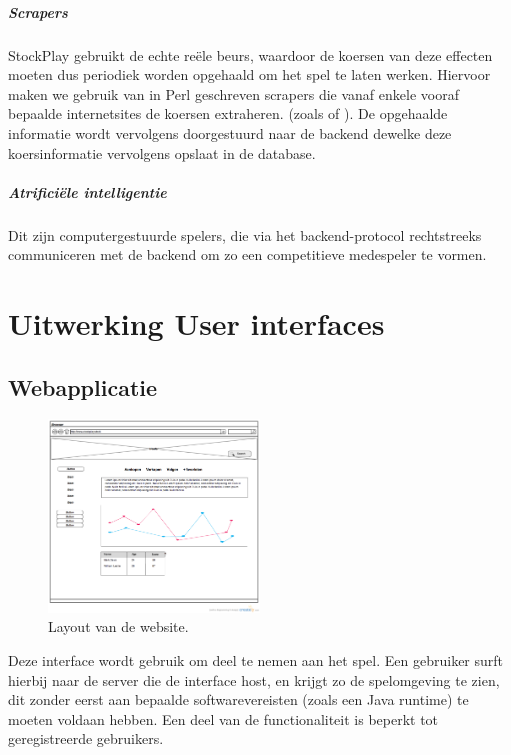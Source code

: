 \subparagraph{Scrapers}
StockPlay gebruikt de echte re\"ele beurs, waardoor de koersen van deze effecten moeten dus periodiek worden opgehaald om het spel te laten werken. Hiervoor maken we gebruik van in Perl geschreven scrapers die vanaf enkele vooraf bepaalde internetsites de koersen extraheren. (zoals  of ).
De opgehaalde informatie wordt vervolgens doorgestuurd naar de backend dewelke deze koersinformatie vervolgens opslaat in de database.

\subparagraph{Atrifici\"ele intelligentie}

Dit zijn computergestuurde spelers, die via het backend-protocol rechtstreeks communiceren met de backend om zo een competitieve medespeler te vormen.


\section{Uitwerking User interfaces}

\subsection{Webapplicatie}

\begin{figure}[h!]
	\centering
		\includegraphics[width=0.5\textwidth]{images/ontwerp/screenshot_website}
	\caption{Layout van de website.}
\end{figure}

Deze interface wordt gebruik om deel te nemen aan het spel. Een gebruiker surft hierbij naar de server die de interface host, en krijgt zo de spelomgeving te zien, dit zonder eerst aan bepaalde softwarevereisten (zoals een Java runtime) te moeten voldaan hebben. Een deel van de functionaliteit is beperkt tot geregistreerde gebruikers.

